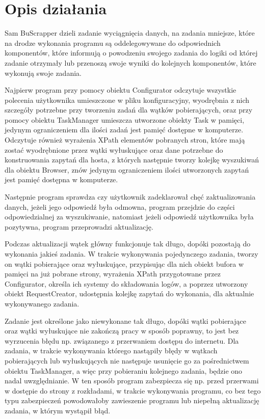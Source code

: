 \documentclass[11pt]{article}
\begin{document}
\section{Opis działania}
Sam BuScrapper dzieli zadanie wyciągnięcia danych, na zadania mniejsze, które na drodze wykonania programu są oddelegowywane do odpowiednich komponentów, które informują o powodzeniu swojego zadania do logiki od której zadanie otrzymały lub przenoszą swoje wyniki do kolejnych komponentów, które wykonują swoje zadania.\newline

Najpierw program przy pomocy obiektu Configurator odczytuje wszystkie polecenia użytkownika umieszczone w pliku konfiguracyjny, wyodrębnia z nich szczegóły potrzebne przy tworzeniu zadań dla wątków pobierających, oraz przy pomocy obiektu TaskManager umieszcza utworzone obiekty Task w pamięci, jedynym ograniczeniem dla ilości zadań jest pamięć dostępne w komputerze. Odczytuje również wyrażenia XPath elementów pobranych stron, które mają zostać wyodrębnione przez wątki wyłuskujące oraz dane potrzebne do konstruowania zapytań dla hosta, z których następnie tworzy kolejkę wyszukiwań dla obiektu Browser, znów jedynym ograniczeniem ilości utworzonych zapytań jest pamięć dostępna w komputerze.\newline

Następnie program sprawdza czy użytkownik zadeklarował chęć zaktualizowania danych, jeżeli jego odpowiedź była odmowna, program przejdzie do części odpowiedzialnej za wyszukiwanie, natomiast jeżeli odpowiedź użytkownika była pozytywna, program przeprowadzi aktualizację.\newline

Podczas aktualizacji wątek główny funkcjonuje tak długo, dopóki pozostają do wykonania jakieś zadania. W trakcie wykonywania pojedynczego zadania, tworzy on wątki pobierające oraz wyłuskujące, przypisując dla nich obiekt bufora w pamięci na już pobrane strony, wyrażenia XPath przygotowane przez Configurator, określa ich systemy do składowania logów, a poprzez utworzony obiekt RequestCreator, udostępnia kolejkę zapytań do wykonania, dla aktualnie wykonywanego zadania.\newline

Zadanie jest określone jako niewykonane tak długo, dopóki wątki pobierające oraz wątki wyłuskujące nie zakończą pracy w sposób poprawny, to jest bez wyrzucenia błędu np. związanego z przerwaniem dostępu do internetu. Dla zadania, w trakcie wykonywania którego nastąpiły błędy w wątkach pobierających lub wyłuskujących nie następuje usunięcie go za pośrednictwem obiektu TaskManager, a więc przy pobieraniu kolejnego zadania, będzie ono nadal uwzględnianie. W ten sposób program zabezpiecza się np. przed przerwami w dostępie do strony z rozkładami, w trakcie wykonywania programu, co bez tego typu zabezpieczeń powodowałoby zawieszenie programu lub niepełną aktualizację zadania, w którym wystąpił błąd.\newline
\end{document}
